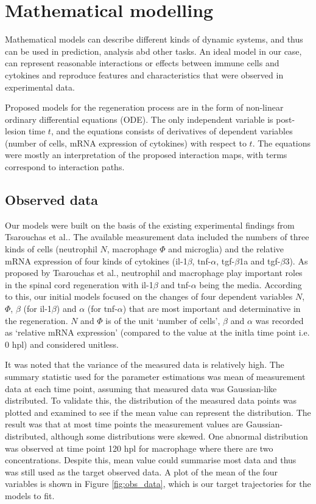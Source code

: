 \chapter{Mathematical modelling}

Mathematical models can describe different kinds of dynamic systems, and thus can be used in prediction, analysis abd other tasks. An ideal model in our case, can represent reasonable interactions or effects between immune cells and cytokines and reproduce features and characteristics that were observed in experimental data.

Proposed models for the regeneration process are in the form of non-linear ordinary differential equations (ODE). The only independent variable is post-lesion time $t$, and the equations consists of derivatives of dependent variables (number of cells, mRNA expression of cytokines) with respect to $t$. The equations were mostly an interpretation of the proposed interaction maps, with terms correspond to interaction paths.


\section{Observed data}

Our models were built on the basis of the existing experimental findings from Tsarouchas et al.\cite{ref:Tsarouchas}. The available measurement data included the numbers of three kinds of cells (neutrophil $N$, macrophage $\Phi$ and microglia) and the relative mRNA expression of four kinds of cytokines (il-1$\beta$, tnf-$\alpha$, tgf-$\beta$1a and tgf-$\beta$3). As proposed by Tsarouchas et al., neutrophil and macrophage play important roles in the spinal cord regeneration with il-1$\beta$ and tnf-$\alpha$ being the media. According to this, our initial models focused on the changes of four dependent variables $N$, $\Phi $, $\beta$ (for il-1$\beta$) and $\alpha$ (for tnf-$\alpha$) that are most important and determinative in the regeneration. $N$ and $\Phi$ is of the unit `number of cells', $\beta$ and $\alpha$ was recorded as `relative mRNA expression' (compared to the value at the initla time point i.e. 0 hpl) and considered unitless.

It was noted that the variance of the measured data is relatively high. The summary statistic used for the parameter estimations was mean of measurement data at each time point, assuming that measured data was Gaussian-like distributed. To validate this, the distribution of the measured data points was plotted and examined to see if the mean value can represent the distribution. The result was that at most time points the measurement values are Gaussian-distributed, although some distributions were skewed. One abnormal distribution was observed at time point 120 hpl for macrophage where there are two concentrations. Despite this, mean value could summarise most data and thus was still used as the target observed data. A plot of the mean of the four variables is shown in Figure \ref{fig:obs_data}, which is our target trajectories for the models to fit.

